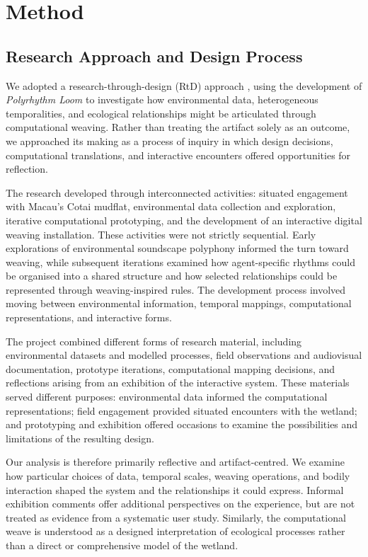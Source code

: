 \documentclass[manuscript,review,anonymous]{acmart}
\begin{document}
\section{Method}

\subsection{Research Approach and Design Process}

We adopted a research-through-design (RtD) approach \cite{zimmerman2007,gaver2012}, using the development of \emph{Polyrhythm Loom} to investigate how environmental data, heterogeneous temporalities, and ecological relationships might be articulated through computational weaving. Rather than treating the artifact solely as an outcome, we approached its making as a process of inquiry in which design decisions, computational translations, and interactive encounters offered opportunities for reflection.

The research developed through interconnected activities: situated engagement with Macau's Cotai mudflat, environmental data collection and exploration, iterative computational prototyping, and the development of an interactive digital weaving installation. These activities were not strictly sequential. Early explorations of environmental soundscape polyphony informed the turn toward weaving, while subsequent iterations examined how agent-specific rhythms could be organised into a shared structure and how selected relationships could be represented through weaving-inspired rules. The development process involved moving between environmental information, temporal mappings, computational representations, and interactive forms.

The project combined different forms of research material, including environmental datasets and modelled processes, field observations and audiovisual documentation, prototype iterations, computational mapping decisions, and reflections arising from an exhibition of the interactive system. These materials served different purposes: environmental data informed the computational representations; field engagement provided situated encounters with the wetland; and prototyping and exhibition offered occasions to examine the possibilities and limitations of the resulting design.

Our analysis is therefore primarily reflective and artifact-centred. We examine how particular choices of data, temporal scales, weaving operations, and bodily interaction shaped the system and the relationships it could express. Informal exhibition comments offer additional perspectives on the experience, but are not treated as evidence from a systematic user study. Similarly, the computational weave is understood as a designed interpretation of ecological processes rather than a direct or comprehensive model of the wetland.
\end{document}
